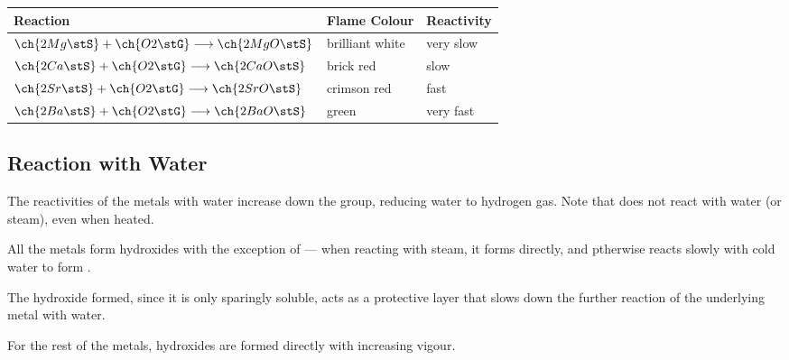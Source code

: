 			\begin{table}[htb]\renewcommand{\arraystretch}{1.5}\begin{center}
			\begin{tabu} to 0.85\textwidth {X[2,c,m] | X[1,c,m] | X[1,c,m]}

				Reaction                                                        &   Flame Colour        &   Reactivity  \\  \hline
				$\ch{2 Mg \stS} + \ch{O2 \stG} \longrightarrow \ch{2 MgO \stS}$ &   brilliant white     &   very slow   \\
				$\ch{2 Ca \stS} + \ch{O2 \stG} \longrightarrow \ch{2 CaO \stS}$ &   brick red           &   slow        \\
				$\ch{2 Sr \stS} + \ch{O2 \stG} \longrightarrow \ch{2 SrO \stS}$ &   crimson red         &   fast        \\
				$\ch{2 Ba \stS} + \ch{O2 \stG} \longrightarrow \ch{2 BaO \stS}$ &   green               &   very fast   \\

			\end{tabu}\end{center}
			\end{table}\vspace{-1em}



		\pagebreak
		\subsection{Reaction with Water}

			The reactivities of the metals with water increase down the group, reducing water to hydrogen gas.
			Note that  does not react with water (or steam), even when heated.

			All the metals form hydroxides with the exception of  --- when reacting with steam,
			it forms  directly, and ptherwise reacts slowly with cold water to form .


			The hydroxide formed, since it is only sparingly soluble, acts as a protective layer that slows down the further reaction of
			the underlying metal with water.

			For the rest of the metals, hydroxides are formed directly with increasing vigour.

